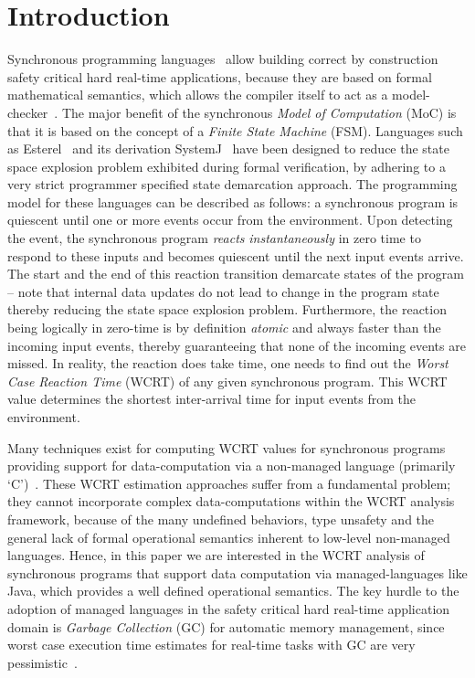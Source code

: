 \section{Introduction}
\label{sec:introduction}

Synchronous programming languages~\cite{berry92} allow building correct
by construction safety critical hard real-time applications, because
they are based on formal mathematical semantics, which allows the
compiler itself to act as a
model-checker~\cite{jagadeesan1995safety}. The major benefit of the
synchronous \textit{Model of Computation} (MoC) is that it is based on
the concept of a \textit{Finite State Machine} (FSM). Languages such as
Esterel~\cite{berry92} and its derivation SystemJ~\cite{amal10} have
been designed to reduce the state space explosion problem exhibited
during formal verification, by adhering to a very strict programmer
specified state demarcation approach. The programming model for these
languages can be described as follows: a synchronous program is
quiescent until one or more events occur from the environment. Upon
detecting the event, the synchronous program \textit{reacts}
\textit{instantaneously} in zero time to respond to these inputs and
becomes quiescent until the next input events arrive. The start and the
end of this reaction transition demarcate states of the program -- note
that internal data updates do not lead to change in the program state
thereby reducing the state space explosion problem. Furthermore, the
reaction being logically in zero-time is by definition \textit{atomic}
and always faster than the incoming input events, thereby guaranteeing
that none of the incoming events are missed. In reality, the reaction
does take time, one needs to find out the \textit{Worst Case Reaction
  Time} (WCRT) of any given synchronous program. This WCRT value
determines the shortest inter-arrival time for input events from the
environment.

Many techniques exist for computing WCRT values for synchronous programs
providing support for data-computation via a non-managed language
(primarily `C')~\cite{boldt07,proop10}. These WCRT estimation approaches
suffer from a fundamental problem; they cannot incorporate complex
data-computations within the WCRT analysis framework, because of the
many undefined behaviors, type unsafety and the general lack of formal
operational semantics inherent to low-level non-managed
languages. Hence, in this paper we are interested in the WCRT analysis
of synchronous programs that support data computation via
managed-languages like Java, which provides a well defined operational
semantics. The key hurdle to the adoption of managed languages in the
safety critical hard real-time application domain is \textit{Garbage
  Collection} (GC) for automatic memory management, since worst case
execution time estimates for real-time tasks with GC are very
pessimistic~\cite{puffitsch2013design}.

